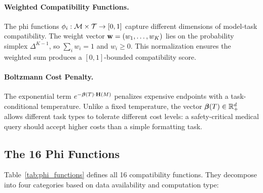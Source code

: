 \paragraph{Weighted Compatibility Functions.} The phi functions $\phi_i: \mathcal{M} \times \mathcal{T} \to [0,1]$ capture different dimensions of model-task compatibility. The weight vector $\mathbf{w} = (w_1, \ldots, w_K)$ lies on the probability simplex $\Delta^{K-1}$, so $\sum_i w_i = 1$ and $w_i \geq 0$. This normalization ensures the weighted sum produces a $[0,1]$-bounded compatibility score.

\paragraph{Boltzmann Cost Penalty.} The exponential term $e^{-\boldsymbol{\beta}(T) \cdot \mathbf{H}(M)}$ penalizes expensive endpoints with a task-conditional temperature. Unlike a fixed temperature, the vector $\boldsymbol{\beta}(T) \in \mathbb{R}^d_+$ allows different task types to tolerate different cost levels: a safety-critical medical query should accept higher costs than a simple formatting task.

\subsection{The 16 Phi Functions}

Table~\ref{tab:phi_functions} defines all 16 compatibility functions. They decompose into four categories based on data availability and computation type:

